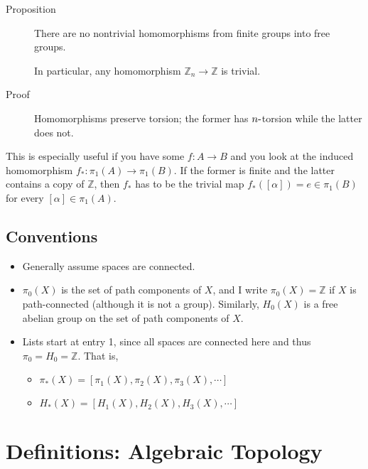 \begin{description}
\item[Proposition]
There are no nontrivial homomorphisms from finite groups into free
groups.

In particular, any homomorphism \({\mathbb{Z}}_n \to {\mathbb{Z}}\) is
trivial.
\item[Proof]
Homomorphisms preserve torsion; the former has \(n{\hbox{-}}\)torsion
while the latter does not.
\end{description}

This is especially useful if you have some \(f: A\to B\) and you look at
the induced homomorphism \(f_*: \pi_1(A) \to\pi_1(B)\). If the former is
finite and the latter contains a copy of \({\mathbb{Z}}\), then \(f_*\)
has to be the trivial map \(f_*([\alpha]) = e \in \pi_1(B)\) for every
\([\alpha] \in \pi_1(A)\).

\hypertarget{conventions}{%
\subsection{Conventions}\label{conventions}}

\begin{itemize}
\item
  Generally assume spaces are connected.
\item
  \(\pi_0(X)\) is the set of path components of \(X\), and I write
  \(\pi_0(X) = {\mathbb{Z}}\) if \(X\) is path-connected (although it is
  not a group). Similarly, \(H_0(X)\) is a free abelian group on the set
  of path components of \(X\).
\item
  Lists start at entry 1, since all spaces are connected here and thus
  \(\pi_0 = H_0 = {\mathbb{Z}}\). That is,

  \begin{itemize}
  \tightlist
  \item
    \(\pi_*(X) = [\pi_1(X), \pi_2(X), \pi_3(X), \cdots]\)
  \item
    \(H_*(X) = [H_1(X), H_2(X), H_3(X), \cdots]\)
  \end{itemize}
\end{itemize}

\hypertarget{definitions-algebraic-topology}{%
\section{Definitions: Algebraic
Topology}\label{definitions-algebraic-topology}}


